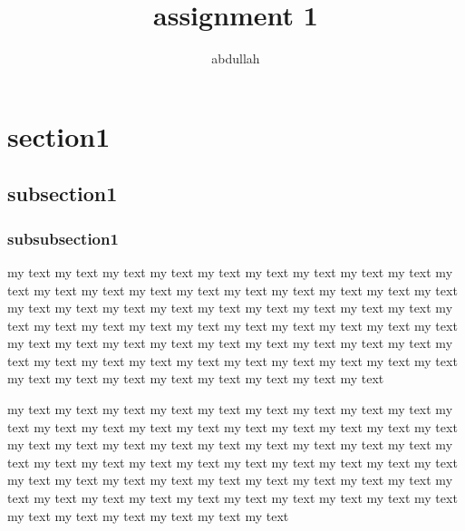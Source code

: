 \documentclass{article}
\title{assignment 1}
\author{abdullah}
\begin{document}
	
	\doublespacing
		\tableofcontents
	\singlespacing
		\section{section1}
		\subsection{subsection1}
		\subsubsection{subsubsection1}
	\doublespacing
	my text my text my text my text my text my text my text my text my text my text my text my text my text my text my text my text my text my text my text my text my text my text my text my text my text my text my text my text my text my text my text my text my text my text my text my text my text my text my text my text my text my text my text my text my text my text my text my text my text my text my text my text my text my text my text my text my text my text my text my text my text my text my text my text my text 
	
	\singlespacing
	my text my text my text my text my text my text my text my text my text my text my text my text my text my text my text my text my text my text my text my text my text my text my text my text my text my text my text my text my text my text my text my text my text my text my text my text my text my text my text my text my text my text my text my text my text my text my text my text my text my text my text my text my text my text my text my text my text my text my text my text my text my text my text 
\end{document}
